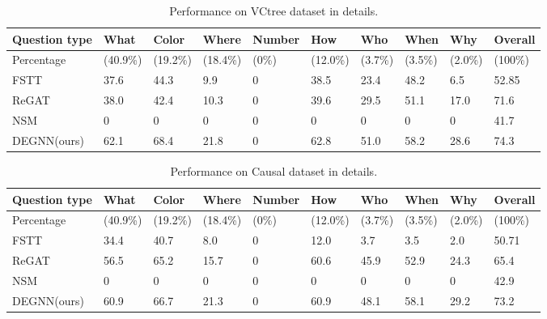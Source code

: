 \begin{table*}
\centering
    \begin{tabular}{l|lllllllll}
    \hline
    \textbf{Question type}&\textbf{What}&\textbf{Color}&\textbf{Where}&\textbf{Number}&\textbf{How}&\textbf{Who}&\textbf{When}&\textbf{Why}&\textbf{Overall}\\
    \hline
     Percentage &(40.9\%) &(19.2\%) &(18.4\%) &(0\%) &(12.0\%) &(3.7\%) &(3.5\%) &(2.0\%) &(100\%)\\
    \hline
     FSTT &37.6 &44.3 &9.9 &0 &38.5 &23.4 &48.2 &6.5 &52.85\\
     ReGAT &38.0 &42.4 &10.3 &0 &39.6 &29.5 &51.1 &17.0 &71.6\\
     NSM &0 &0 &0 &0 &0 &0 &0 &0 &41.7\\
     DEGNN(ours) &62.1 &68.4 &21.8 &0 &62.8 &51.0 &58.2 &28.6 &74.3\\
    \hline
    \end{tabular}
\caption{\label{VCtree-detail}
Performance on VCtree dataset in details.
}
\end{table*}

\begin{table*}
\centering
    \begin{tabular}{l|lllllllll}
    \hline
    \textbf{Question type}&\textbf{What}&\textbf{Color}&\textbf{Where}&\textbf{Number}&\textbf{How}&\textbf{Who}&\textbf{When}&\textbf{Why}&\textbf{Overall}\\
    \hline
     Percentage &(40.9\%) &(19.2\%) &(18.4\%) &(0\%) &(12.0\%) &(3.7\%) &(3.5\%) &(2.0\%) &(100\%)\\
    \hline
     FSTT &34.4 &40.7 &8.0 &0 &12.0 &3.7 &3.5 &2.0 &50.71\\
     ReGAT &56.5 &65.2 &15.7 &0 &60.6 &45.9 &52.9 &24.3 &65.4\\
     NSM &0 &0 &0 &0 &0 &0 &0 &0 &42.9\\
     DEGNN(ours) &60.9 &66.7 &21.3 &0 &60.9 &48.1 &58.1 &29.2 &73.2\\
    \hline
    \end{tabular}
\caption{\label{Causal-detail}
Performance on Causal dataset in details.
}
\end{table*}

